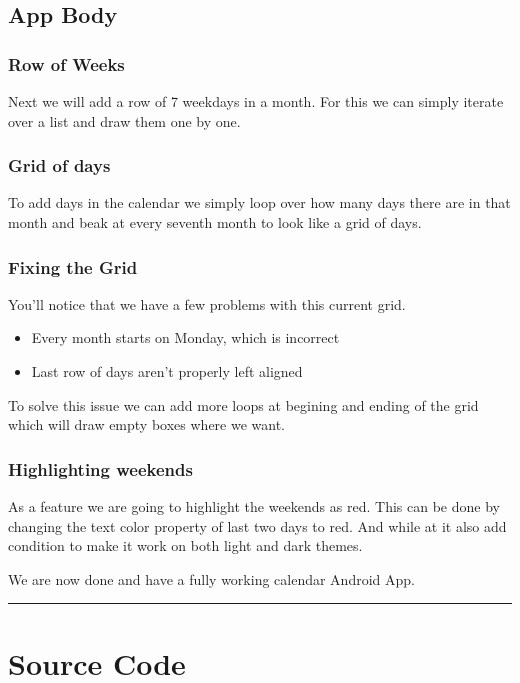 \documentclass[12pt,oneside]{book}
\begin{document}
\section{App Body}
\subsection{Row of Weeks}
Next we will add a row of 7 weekdays in a month. For this we can simply iterate over a list and draw them one by one.

\subsection{Grid of days}
To add days in the calendar we simply loop over how many days there are in that month and beak at every seventh month to look like a grid of days.

\subsection{Fixing the Grid}
You'll notice that we have a few problems with this current grid.
\begin{itemize}
  \item Every month starts on Monday, which is incorrect
  \item Last row of days aren't properly left aligned
\end{itemize}
To solve this issue we can add more loops at begining and ending of the grid which will draw empty boxes where we want.

\subsection{Highlighting weekends}
As a feature we are going to highlight the weekends as red. This can be done by changing the text color property of last two days to red. And while at it also add condition to make it work on both light and dark themes.

\vspace*{2\baselineskip}
We are now done and have a fully working calendar Android App.

\vfill \rule{\textwidth}{0.4pt}

\chapter{Source Code}
\end{document}
